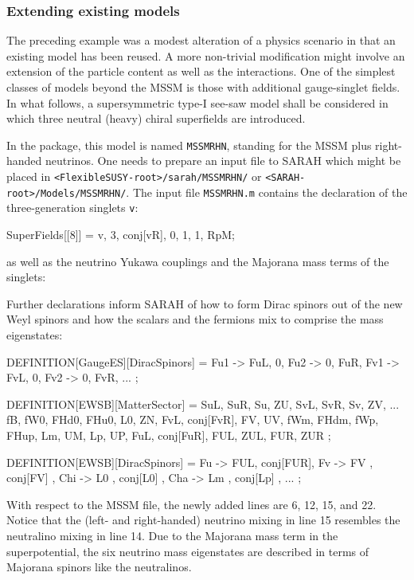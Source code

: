\documentclass[final,3p,11pt,pdflatex]{elsarticle}
\makeatletter
\newcommand{\sarah}{SARAH\@\xspace}
\newcommand{\fs}{FlexibleSUSY\@\xspace}
\newcommand{\code}[1]{\lstinline|#1|}  %
\makeatother
\begin{document}
\subsubsection{Extending existing models}

The preceding example was a modest alteration of a physics scenario
in that an existing model has been reused.
A more non-trivial modification might involve
an extension of the particle content as well as the interactions.
One of the simplest classes of models beyond the MSSM is
those with additional gauge-singlet fields.
In what follows, a supersymmetric type-I see-saw model
\cite{see-saw} 
shall be considered in which
three neutral (heavy) chiral superfields are introduced.

In the package, this model is named \code{MSSMRHN}, standing for
the MSSM plus right-handed neutrinos.
One needs to prepare an input file to \sarah which might be placed in
\code{<FlexibleSUSY-root>/sarah/MSSMRHN/} or
\code{<SARAH-root>/Models/MSSMRHN/}.
The input file \code{MSSMRHN.m} contains
the declaration of the three-generation singlets \code{v}:
\begin{numlstlisting}[name=MSSMRHN.m]
SuperFields[[8]] = {v, 3, conj[vR], 0, 1, 1, RpM};
\end{numlstlisting}
as well as the neutrino Yukawa couplings and the Majorana mass terms
of the singlets:
\begin{numlstlisting}[name=MSSMRHN.m]
SuperPotential = Yu u.q.Hu - Yd d.q.Hd - Ye e.l.Hd + \[Mu] Hu.Hd +
                 Yv v.l.Hu + Mv/2 v.v;
\end{numlstlisting}
Further declarations inform \sarah
of how to form Dirac spinors out of the new Weyl spinors
and how the scalars and the fermions mix to comprise
the mass eigenstates:
\begin{numlstlisting}[name=MSSMRHN.m]
DEFINITION[GaugeES][DiracSpinors] = {
  Fu1 -> {FuL, 0}, Fu2 -> {0, FuR},
  Fv1 -> {FvL, 0}, Fv2 -> {0, FvR},
  ...
};

DEFINITION[EWSB][MatterSector] = {
  {{SuL, SuR}, {Su, ZU}},
  {{SvL, SvR}, {Sv, ZV}},
  ...
  {{fB, fW0, FHd0, FHu0}, {L0, ZN}},
  {{FvL, conj[FvR]}, {FV, UV}},
  {{{fWm, FHdm}, {fWp, FHup}}, {{Lm, UM}, {Lp, UP}}},
  {{{FuL}, {conj[FuR]}}, {{FUL, ZUL}, {FUR, ZUR}}}
};

DEFINITION[EWSB][DiracSpinors] = {
  Fu  -> {FUL, conj[FUR]},
  Fv  -> {FV , conj[FV] },
  Chi -> {L0 , conj[L0] },
  Cha -> {Lm , conj[Lp] },
  ...
};
\end{numlstlisting}
With respect to the MSSM file, the newly added lines are
6, 12, 15, and 22.
Notice that the (left- and right-handed) neutrino mixing
in line 15 resembles the neutralino mixing in line 14.
Due to the Majorana mass term in the superpotential,
the six neutrino mass eigenstates are described in terms of
Majorana spinors like the neutralinos.
\end{document}
